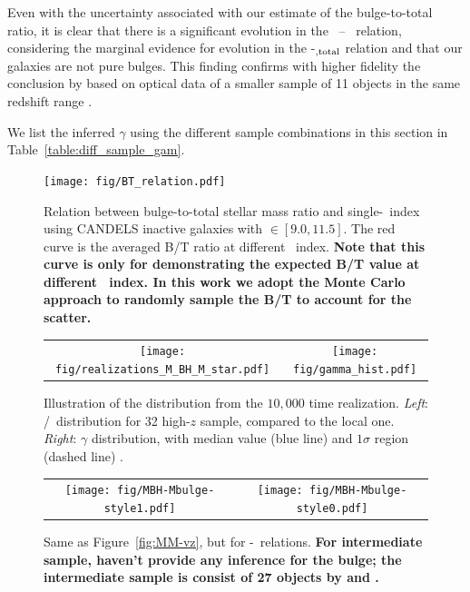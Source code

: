\documentclass[apj]{emulateapj}
\begin{document}
Even with the uncertainty associated with our estimate of the
bulge-to-total ratio, it is clear that there is a significant evolution
in the \mbh\ -- \bmass\ relation, considering the
marginal evidence for evolution in the \mbh-\smass$_{\rm, total}$
relation and that our galaxies are not pure bulges. This finding
confirms with higher fidelity the conclusion by \citet{Bennert11}
based on optical data of a smaller sample of 11 objects in the same
redshift range \citep[see][for similar results]{SS13, Jah++09, Cisternas2011}.

We list the inferred $\gamma$ using the different sample combinations in this section in
Table~\ref{table:diff_sample_gam}.

\begin{figure}
\centering
{
\texttt{[image: fig/BT\_relation.pdf]}
}
\caption{\label{fig:BT-n_relation} 
Relation between bulge-to-total stellar mass ratio and single-\sersic\ index using CANDELS inactive galaxies with \smass$\in [9.0, 11.5]$. The red curve is the averaged B/T ratio at different \sersic\ index. {\bf Note that this curve is only for demonstrating the expected B/T value at different \sersic\ index. In this work we adopt the Monte Carlo approach to randomly sample the B/T to account for the scatter.}
}
\end{figure} 

\begin{figure}
\centering
\begin{tabular}{c c}
{\texttt{[image: fig/realizations\_M\_BH\_M\_star.pdf]}}&
{\texttt{[image: fig/gamma\_hist.pdf]}}\\
\end{tabular}
\caption{\label{fig:gamma_hist} 
Illustration of the distribution from the $10,000$ time realization. {\it Left}: \mbh/\smass\ distribution for 32 high-$z$ sample, compared to the local one. {\it Right}: $\gamma$ distribution, with median value (blue line) and $1\sigma$ region (dashed line) .
}
\end{figure}

\begin{figure}
\centering
\begin{tabular}{c c}
{\texttt{[image: fig/MBH-Mbulge-style1.pdf]}}&
{\texttt{[image: fig/MBH-Mbulge-style0.pdf]}}\\
\end{tabular}
\caption{\label{fig:MM_bulge-vz}
Same as Figure~\ref{fig:MM-vz}, but for \mbh-\bmass\ relations. {\bf For intermediate sample, \citet{Cisternas2011} haven't provide any inference for the bulge; the intermediate sample is consist of 27 objects by \citet{Bennert11} and \citet{SS13}.}}
\end{figure} 
\end{document}
